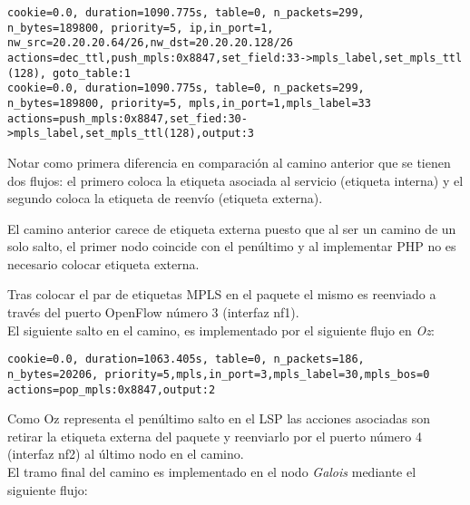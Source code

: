\begin{center}
\texttt{cookie=0.0, duration=1090.775s, table=0, n\_packets=299, \\
n\_bytes=189800, priority=5, ip,in\_port=1,\\ 
nw\_src=20.20.20.64/26,nw\_dst=20.20.20.128/26 \\
actions=dec\_ttl,push\_mpls:0x8847,set\_field:33->mpls\_label,set\_mpls\_ttl (128), goto\_table:1 \\
\vspace{0.5cm}
cookie=0.0, duration=1090.775s, table=0, n\_packets=299, \\
n\_bytes=189800, priority=5, mpls,in\_port=1,mpls\_label=33 \\
actions=push\_mpls:0x8847,set\_fied:30->mpls\_label,set\_mpls\_ttl(128),output:3
}
\end{center}

Notar como primera diferencia en comparación al camino anterior que se tienen dos flujos: el primero coloca la etiqueta asociada al servicio (etiqueta interna) y el segundo coloca la etiqueta de reenvío (etiqueta externa). 

El camino anterior carece de etiqueta externa puesto que al ser un camino de un solo salto, el primer nodo coincide con el pen\'ultimo y al implementar PHP no es necesario colocar etiqueta externa. 

Tras colocar el par de etiquetas MPLS en el paquete el mismo es reenviado a trav\'es del puerto OpenFlow n\'umero 3 (interfaz nf1).\\

El siguiente salto en el camino, es implementado por el siguiente flujo en \textit{Oz}:

\newpage
\begin{center}
\texttt{cookie=0.0, duration=1063.405s, table=0, n\_packets=186, \\
n\_bytes=20206, priority=5,mpls,in\_port=3,mpls\_label=30,mpls\_bos=0 \\
actions=pop\_mpls:0x8847,output:2 }
\end{center}

Como Oz representa el penúltimo salto en el LSP las acciones asociadas son retirar la etiqueta externa del paquete y reenviarlo por el puerto n\'umero 4 (interfaz nf2) al \'ultimo nodo en el camino.\\

El tramo final del camino es implementado en el nodo \textit{Galois} mediante el siguiente flujo:

